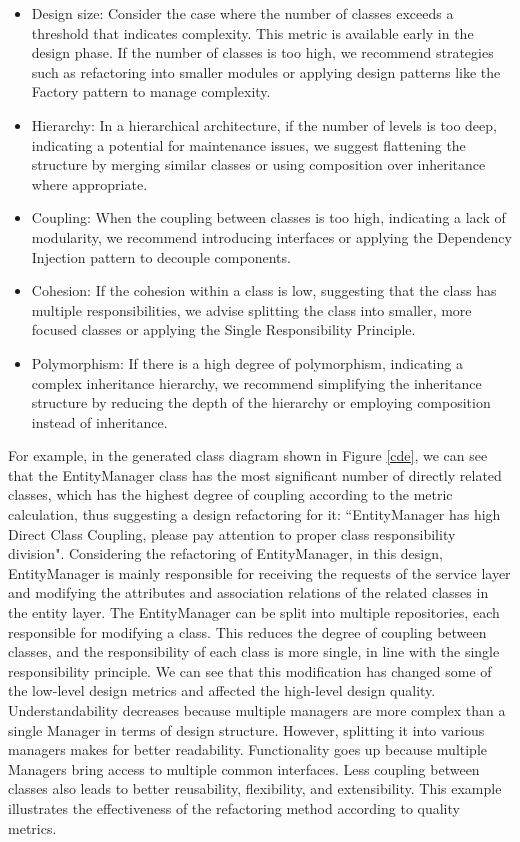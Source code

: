 \documentclass[pdflatex,sn-mathphys-num]{sn-jnl}%
\theoremstyle{thmstyleone}%
\theoremstyle{thmstyletwo}%
\theoremstyle{thmstylethree}%
\begin{document}
\begin{itemize}
    \item Design size: Consider the case where the number of classes exceeds a threshold that indicates complexity. This metric is available early in the design phase. If the number of classes is too high, we recommend strategies such as refactoring into smaller modules or applying design patterns like the Factory pattern to manage complexity.
    \item Hierarchy: In a hierarchical architecture, if the number of levels is too deep, indicating a potential for maintenance issues, we suggest flattening the structure by merging similar classes or using composition over inheritance where appropriate.
    \item Coupling: When the coupling between classes is too high, indicating a lack of modularity, we recommend introducing interfaces or applying the Dependency Injection pattern to decouple components.
    \item Cohesion: If the cohesion within a class is low, suggesting that the class has multiple responsibilities, we advise splitting the class into smaller, more focused classes or applying the Single Responsibility Principle.
    \item Polymorphism: If there is a high degree of polymorphism, indicating a complex inheritance hierarchy, we recommend simplifying the inheritance structure by reducing the depth of the hierarchy or employing composition instead of inheritance.
\end{itemize}

For example, in the generated class diagram shown in Figure \ref{cde}, we can see that the EntityManager class has the most significant number of directly related classes, which has the highest degree of coupling according to the metric calculation, thus suggesting a design refactoring for it: ``EntityManager has high Direct Class Coupling, please pay attention to proper class responsibility division". Considering the refactoring of EntityManager, in this design, EntityManager is mainly responsible for receiving the requests of the service layer and modifying the attributes and association relations of the related classes in the entity layer. The EntityManager can be split into multiple repositories, each responsible for modifying a class. This reduces the degree of coupling between classes, and the responsibility of each class is more single, in line with the single responsibility principle. We can see that this modification has changed some of the low-level design metrics and affected the high-level design quality. Understandability decreases because multiple managers are more complex than a single Manager in terms of design structure. However, splitting it into various managers makes for better readability. Functionality goes up because multiple Managers bring access to multiple common interfaces. Less coupling between classes also leads to better reusability, flexibility, and extensibility. This example illustrates the effectiveness of the refactoring method according to quality metrics.
\end{document}
